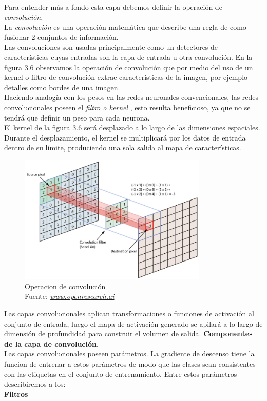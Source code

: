Para entender más a fondo esta capa debemos definir la operación de \textit{convolución}.\\  La \textit{convolución} es una operación matemática que describe una regla de como fusionar 2 conjuntos de información.\\
Las convoluciones son usadas principalmente como un detectores de características cuyas entradas son la capa de entrada u otra convolución.
En la figura 3.6 observamos la operación de convolución que por medio del uso de un kernel o filtro de convolución extrae características de la imagen, por ejemplo detalles como bordes de una imagen.\\ Haciendo analogía con los pesos en las redes neuronales convencionales, las redes convolucionales poseen el \textit{ filtro o kernel }, esto resulta beneficioso, ya que no se tendrá que definir un peso para cada neurona.\\ El kernel de la figura 3.6 será desplazado a lo largo de las dimensiones espaciales. Durante el desplazamiento, el kernel se multiplicará por los datos de entrada dentro de su límite, produciendo una sola salida al mapa de características.
\begin{figure}[H]
	\centering
	\includegraphics[width=0.8\textwidth]{Figures/convolucion.jpeg}
	\caption{Operacion de convolución \\ Fuente:  \href{http://openresearch.ai/t/network-in-network/39}{\textit{www.openresearch.ai}}}
	\label{convolucion}
\end{figure} 

Las capas convolucionales aplican transformaciones o funciones de activación al conjunto de entrada, luego el mapa de activación generado se apilará a lo largo de dimensión de profundidad para construir el volumen de salida.
\vspace{2cm}
\textbf{Componentes de la capa de convolución}.\\
Las capas convolucionales poseen parámetros. La gradiente de descenso tiene la funcion de entrenar a estos parámetros de modo que las clases sean consistentes con las etiquetas en el conjunto de entrenamiento. Entre estos parámetros describiremos a los:\\
\textbf{Filtros}

